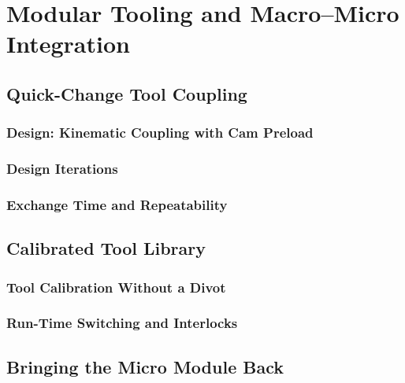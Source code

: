 \chapter{Modular Tooling and Macro--Micro Integration}
\label{ch:modularity}

\section{Quick-Change Tool Coupling}
\label{sec:mod-coupling}

\subsection{Design: Kinematic Coupling with Cam Preload}
\label{sec:mod-design}

\subsection{Design Iterations}
\label{sec:mod-iterations}

\subsection{Exchange Time and Repeatability}
\label{sec:mod-repeatability}

\section{Calibrated Tool Library}
\label{sec:mod-tool-library}

\subsection{Tool Calibration Without a Divot}
\label{sec:mod-tool-calibration}

\subsection{Run-Time Switching and Interlocks}
\label{sec:mod-switching}

\section{Bringing the Micro Module Back}
\label{sec:mod-micro}


